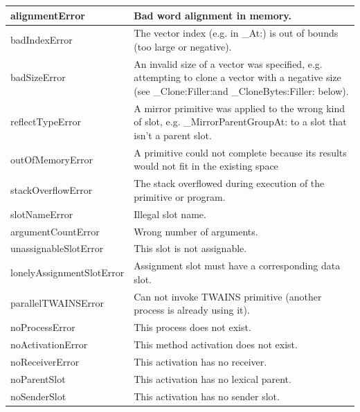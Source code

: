 \documentclass[letterpaper,10pt,english]{sphinxmanual}
\begin{document}
\begin{longtable}{p{5cm} p{10cm}}
alignmentError
 & 
Bad word alignment in memory.
\\\hline

badIndexError
 & 
The vector index (e.g. in \_At:) is out of bounds (too large or negative).
\\\hline

badSizeError
 & 
An invalid size of a vector was specified, e.g. attempting to clone a vector with a negative size (see \_Clone:Filler:and \_CloneBytes:Filler: below).
\\\hline

reflectTypeError
 & 
A mirror primitive was applied to the wrong kind of slot, e.g. \_MirrorParentGroupAt: to a slot that isn’t a parent slot.
\\\hline

outOfMemoryError
 & 
A primitive could not complete because its results would not fit in the existing
space
\\\hline

stackOverflowError
 & 
The stack overflowed during execution of the primitive or program.
\\\hline

slotNameError
 & 
Illegal slot name.
\\\hline

argumentCountError
 & 
Wrong number of arguments.
\\\hline

unassignableSlotError
 & 
This slot is not assignable.
\\\hline

lonelyAssignmentSlotError
 & 
Assignment slot must have a corresponding data slot.
\\\hline

parallelTWAINSError
 & 
Can not invoke TWAINS primitive (another process is already using it).
\\\hline

noProcessError
 & 
This process does not exist.
\\\hline

noActivationError
 & 
This method activation does not exist.
\\\hline

noReceiverError
 & 
This activation has no receiver.
\\\hline

noParentSlot
 & 
This activation has no lexical parent.
\\\hline

noSenderSlot
 & 
This activation has no sender slot.
\\\hline


\end{longtable}
\end{document}
